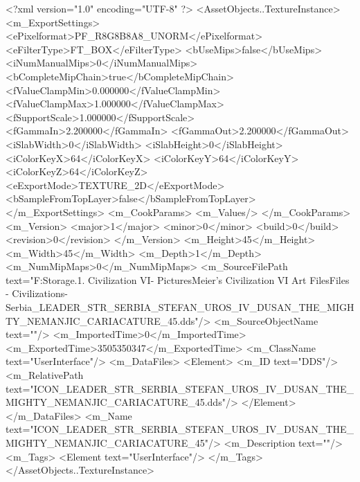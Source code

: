<?xml version="1.0" encoding="UTF-8" ?>
<AssetObjects..TextureInstance>
	<m_ExportSettings>
		<ePixelformat>PF_R8G8B8A8_UNORM</ePixelformat>
		<eFilterType>FT_BOX</eFilterType>
		<bUseMips>false</bUseMips>
		<iNumManualMips>0</iNumManualMips>
		<bCompleteMipChain>true</bCompleteMipChain>
		<fValueClampMin>0.000000</fValueClampMin>
		<fValueClampMax>1.000000</fValueClampMax>
		<fSupportScale>1.000000</fSupportScale>
		<fGammaIn>2.200000</fGammaIn>
		<fGammaOut>2.200000</fGammaOut>
		<iSlabWidth>0</iSlabWidth>
		<iSlabHeight>0</iSlabHeight>
		<iColorKeyX>64</iColorKeyX>
		<iColorKeyY>64</iColorKeyY>
		<iColorKeyZ>64</iColorKeyZ>
		<eExportMode>TEXTURE_2D</eExportMode>
		<bSampleFromTopLayer>false</bSampleFromTopLayer>
	</m_ExportSettings>
	<m_CookParams>
		<m_Values/>
	</m_CookParams>
	<m_Version>
		<major>1</major>
		<minor>0</minor>
		<build>0</build>
		<revision>0</revision>
	</m_Version>
	<m_Height>45</m_Height>
	<m_Width>45</m_Width>
	<m_Depth>1</m_Depth>
	<m_NumMipMaps>0</m_NumMipMaps>
	<m_SourceFilePath text="F:\Mod Storage\2.1. Civilization VI\Mods\Archive - Pictures\Sid Meier's Civilization VI Art Files\Art Files - Civilizations\Civilization - Serbia\ICON_LEADER_STR_SERBIA_STEFAN_UROS_IV_DUSAN_THE_MIGHTY_NEMANJIC_CARIACATURE_45.dds"/>
	<m_SourceObjectName text=""/>
	<m_ImportedTime>0</m_ImportedTime>
	<m_ExportedTime>3505350347</m_ExportedTime>
	<m_ClassName text="UserInterface"/>
	<m_DataFiles>
		<Element>
			<m_ID text="DDS"/>
			<m_RelativePath text="ICON_LEADER_STR_SERBIA_STEFAN_UROS_IV_DUSAN_THE_MIGHTY_NEMANJIC_CARIACATURE_45.dds"/>
		</Element>
	</m_DataFiles>
	<m_Name text="ICON_LEADER_STR_SERBIA_STEFAN_UROS_IV_DUSAN_THE_MIGHTY_NEMANJIC_CARIACATURE_45"/>
	<m_Description text=""/>
	<m_Tags>
		<Element text="UserInterface"/>
	</m_Tags>
</AssetObjects..TextureInstance>

